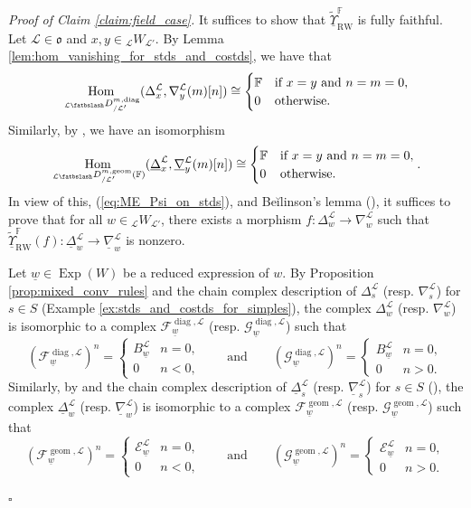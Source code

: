 \documentclass{amsart}
\newcommand{\F}{\mathbb{F}}
\newcommand{\scrF}{\mathcal{F}}
\newcommand{\scrG}{\mathcal{G}}
\newcommand{\scrE}{\mathcal{E}}
\newcommand{\scrL}{\mathcal{L}}
\DeclareMathOperator{\Hom}{Hom}
\newcommand{\fr}[1]{\mathfrak{#1}}
\DeclareMathOperator{\RW}{RW}
\DeclareMathOperator{\diag}{diag}
\DeclareMathOperator{\geom}{geom}
\newcommand{\DGME}[2]{\:_{#1 \smallleftdash} D_{/ #2}^{m, \geom}}
\newcommand{\unabla}{\underline{\nabla}}
\newcommand{\uDelta}{\underline{\Delta}}
\newcommand{\DDME}[2]{\:_{#1 \smallleftdash} D_{/ #2}^{m, \diag}}
\DeclareMathOperator{\Exp}{Exp}
\newcommand{\W}[2]{{}_{#1}W_{#2}}
\newcommand{\uw}{\underline{w}}
\newcommand{\bfslash}{\mathbin{\fatbslash}}
\newcommand*\smallleftdash{\bfslash}
\theoremstyle{definition}
\newenvironment{midsecproof}[1]{\vspace{\topsep} \noindent \textit{Proof of #1.}}{\hfill $\square$}
\numberwithin{equation}{subsection}
\begin{document}
\begin{midsecproof}{Claim \ref{claim:field_case}}
  It suffices to show that $\underline{\tilde{\Upsilon}}_{\RW}^{\F}$ is fully faithful.
  Let $\scrL \in \fr{o}$ and $x,y \in \W{\scrL}{\scrL'}$.
  By Lemma \ref{lem:hom_vanishing_for_stds_and_costds}, we have that 
  \begin{equation}\label{eq:field_case_1}
    \Hom_{\DDME{\scrL}{\scrL'}} (\Delta_x^{\scrL} , \nabla_y^{\scrL} (m) [n]) \cong \begin{cases} \F & \text{if } x=y \text{ and } n=m=0, \\ 0 & \text{otherwise.}\end{cases}
  \end{equation}
  Similarly, by \cite[Lemma 2.3.4]{Sandvik}, we have an isomorphism
  \begin{equation}\label{eq:field_case_2}
    \Hom_{\DGME{\scrL}{\scrL'} (\F)} (\uDelta_x^{\scrL} , \unabla_y^{\scrL} (m) [n]) \cong \begin{cases} \F & \text{if } x=y \text{ and } n=m=0,\\ 0 & \text{otherwise.}\end{cases}.
  \end{equation}
   In view of this, (\ref{eq:ME_Psi_on_stds}), and Beĭlinson's lemma (\cite[Lemma 3.9.3]{ABG}), it suffices to prove that for all $w \in \W{\scrL}{\scrL'}$, there exists a morphism $f  : \Delta_w^{\scrL} \to \nabla_w^{\scrL}$ such that $\underline{\tilde{\Upsilon}}_{\RW}^{\F} (f) : \uDelta_w^{\scrL} \to \unabla_w^{\scrL}$ is nonzero. 

   Let $\uw \in \Exp (W)$ be a reduced expression of $w$. 
   By Proposition \ref{prop:mixed_conv_rules} and the chain complex description of $\Delta_s^{\scrL}$ (resp. $\nabla_s^{\scrL}$) for $s \in S$ (Example \ref{ex:stds_and_costds_for_simples}), the complex $\Delta_w^{\scrL}$ (resp. $\nabla_w^{\scrL}$) is isomorphic to a complex $\scrF_{\uw}^{\diag, \scrL}$ (resp. $\scrG_{\uw}^{\diag, \scrL}$)
   such that 
   \[(\scrF_{\uw}^{\diag, \scrL})^n = \begin{cases} B_{\uw}^{\scrL} & n = 0, \\ 0 & n < 0, \end{cases} \qquad\text{and}\qquad (\scrG_{\uw}^{\diag, \scrL})^n = \begin{cases} B_{\uw}^{\scrL} & n = 0, \\ 0 & n > 0. \end{cases} \]
   Similarly, by \cite[Proposition 3.9.6]{Sandvik} and the chain complex description of $\uDelta_s^{\scrL}$ (resp. $\unabla_s^{\scrL}$) for $s \in S$ (\cite[(3.9.1)]{Sandvik}), the complex $\uDelta_w^{\scrL}$ (resp. $\unabla_w^{\scrL}$) is isomorphic to a complex $\scrF_{\uw}^{\geom, \scrL}$ (resp. $\scrG_{\uw}^{\geom, \scrL}$)
   such that
  \[(\scrF_{\uw}^{\geom, \scrL})^n = \begin{cases} \scrE_{\uw}^{\scrL} & n = 0, \\ 0 & n < 0, \end{cases} \qquad\text{and}\qquad (\scrG_{\uw}^{\geom, \scrL})^n = \begin{cases} \scrE_{\uw}^{\scrL} & n = 0, \\ 0 & n > 0. \end{cases} \]


\end{midsecproof}
\end{document}
